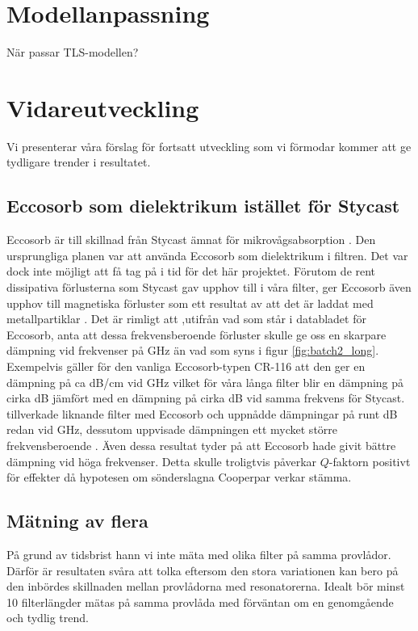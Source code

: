 \documentclass[main.tex]{subfiles}
\begin{document}
\section{Modellanpassning}
När passar TLS-modellen? 


\section{Vidareutveckling}
Vi presenterar våra förslag för fortsatt utveckling som vi förmodar kommer att ge tydligare trender i resultatet.

\subsection{Eccosorb som dielektrikum istället för Stycast}
Eccosorb är till skillnad från Stycast ämnat för mikrovågsabsorption . Den ursprungliga planen var att använda Eccosorb som dielektrikum i filtren. Det var dock inte möjligt att få tag på i tid för det här projektet. Förutom de rent dissipativa förlusterna som Stycast gav upphov till i våra filter, ger Eccosorb även upphov till magnetiska förluster som ett resultat av att det är laddat med metallpartiklar \cite{Eccosorb}. Det är rimligt att ,utifrån vad som står i databladet för Eccosorb, anta att dessa frekvensberoende förluster skulle ge oss en skarpare dämpning vid frekvenser på \unit[8-50]{GHz} än vad som syns i figur \ref{fig:batch2_long}. Exempelvis gäller för den vanliga Eccosorb-typen CR-116 att den ger en dämpning på ca \unit[57]{dB/cm} vid \unit[18]{GHz} \cite{Eccosorb} vilket för våra långa filter blir en dämpning på cirka \unit[150]{dB} jämfört med en dämpning på cirka \unit[10]{dB} vid samma frekvens för Stycast. \citeauthor{santavicca2008} tillverkade liknande filter med Eccosorb och uppnådde dämpningar på runt \unit[80]{dB} redan vid \unit[10]{GHz}, dessutom uppvisade dämpningen ett mycket större frekvensberoende \cite{santavicca2008}. Även dessa resultat tyder på att Eccosorb hade givit bättre dämpning vid höga frekvenser. Detta skulle troligtvis påverkar $Q$-faktorn positivt för effekter då hypotesen om sönderslagna Cooperpar verkar stämma.

\subsection{Mätning av flera }
På grund av tidsbrist hann vi inte mäta med olika filter på samma provlådor. Därför är resultaten svåra att tolka eftersom den stora variationen kan bero på den inbördes skillnaden mellan provlådorna med resonatorerna. Idealt bör minst 10 filterlängder mätas på samma provlåda med förväntan om en genomgående och tydlig trend.
\end{document}
